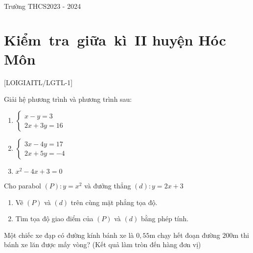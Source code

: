 \def\x{210}
\setcounter{bt}{0}
\setcounter{ex}{0}
\begin{name}{Trường THCS}{2023 - 2024}
\end{name}
\section{Kiểm~tra~giữa~kì~II huyện Hóc Môn}
[LOIGIAITL/LGTL-1]
\luuloigiaibt
\begin{bt}[3,0 điểm]
	Giải hệ phương trình và phương trình sau:
	\begin{enumerate}
		\item $\left\{\begin{array}{l}x-y=3\\ 2x+3y=16\end{array}\right.$
		\item $\left\{\begin{array}{l}3x-4y=17\\ 2x+5y=-4\end{array}\right.$
		\item $x^2-4x+3=0$
	\end{enumerate}
	\loigiai{}
\end{bt}
\begin{bt}[1,5 điểm]
	Cho parabol $(P)\colon y=x^2$ và đưởng thẳng $(d)\colon y=2x+3$
	\begin{enumerate}
		\item Vẽ $(P)$ và $(d)$ trên cùng mặt phẳng tọa độ.
		\item Tìm tọa độ giao điểm của $(P)$ và $(d)$ bằng phép tính.
	\end{enumerate}
	\loigiai{}
\end{bt}

\begin{bt}[1,0 điểm]
	Một chiếc xe đạp có đường kính bánh xe là $0,55\mathrm{m}$ chạy hết đoạn đường $200\mathrm{m}$ thi bánh xe lăn được mấy vòng? (Kết quả làm tròn đến hàng đơn vị)
	\loigiai{}
\end{bt}

